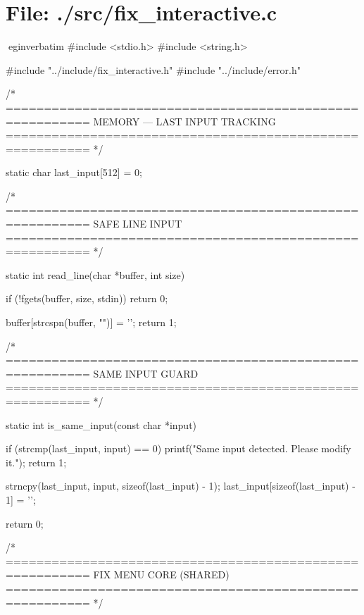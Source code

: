 \documentclass{article}
\begin{document}
\section*{File: ./src/fix_interactive.c}
egin{verbatim}
#include <stdio.h>
#include <string.h>

#include "../include/fix_interactive.h"
#include "../include/error.h"

/* =========================================================
   MEMORY — LAST INPUT TRACKING
========================================================= */

static char last_input[512] = {0};

/* =========================================================
   SAFE LINE INPUT
========================================================= */

static int read_line(char *buffer, int size)
{
    if (!fgets(buffer, size, stdin))
        return 0;

    buffer[strcspn(buffer, "\n")] = '\0';
    return 1;
}

/* =========================================================
   SAME INPUT GUARD
========================================================= */

static int is_same_input(const char *input)
{
    if (strcmp(last_input, input) == 0)
    {
        printf("\n[SYSTEM] Same input detected. Please modify it.\n");
        return 1;
    }

    strncpy(last_input, input, sizeof(last_input) - 1);
    last_input[sizeof(last_input) - 1] = '\0';

    return 0;
}

/* =========================================================
   FIX MENU CORE (SHARED)
========================================================= */
\end{document}

